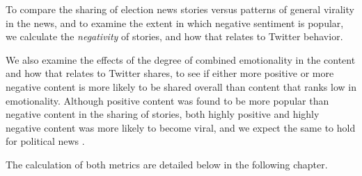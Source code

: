 To compare the sharing of election news stories versus patterns of general virality in the news, and to examine the extent in which negative sentiment is popular, we calculate the \emph{negativity} of stories, and how that relates to Twitter behavior.

We also examine the effects of the degree of combined emotionality in the content and how that relates to Twitter shares, to see if either more positive or more negative content is more likely to be shared overall than content that ranks low in emotionality. Although positive content was found to be more popular than negative content in the sharing of stories, both highly positive and highly negative content was more likely to become viral, and we expect the same to hold for political news \cite{berger2012makes}. 

The calculation of both metrics are detailed below in the following chapter.












